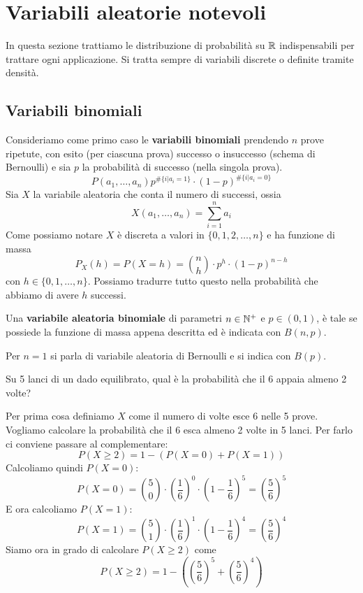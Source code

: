 \section{Variabili aleatorie notevoli}
In questa sezione trattiamo le distribuzione di probabilità su $\mathbb{R}$ indispensabili per trattare
ogni applicazione. Si tratta sempre di variabili discrete o definite tramite densità.

\subsection{Variabili binomiali}
Consideriamo come primo caso le \textbf{variabili binomiali} prendendo $n$ prove ripetute, con
esito (per ciascuna prova) successo o insuccesso (schema di Bernoulli) e sia $p$ la probabilità di
successo (nella singola prova).
\[ P(a_1, \dots, a_n) p^{\# \{i | a_i=1\}} \cdot (1-p)^{\# \{ i | a_i=0 \}} \]
Sia $X$ la variabile aleatoria che conta il numero di successi, ossia
\[ X(a_1, \dots, a_n) = \sum_{i=1}^n a_i \]
Come possiamo notare $X$ è discreta a valori in $\{0,1,2,\dots,n\}$ e ha funzione di massa
\[ P_X(h) = P(X = h) = \binom{n}{h} \cdot p^h \cdot (1-p)^{n-h} \]
con $h \in \{ 0, 1, \dots, n \}$. Possiamo tradurre tutto questo nella probabilità che abbiamo di
avere $h$ successi.

Una \textbf{variabile aleatoria binomiale} di parametri $n \in \mathbb{N}^+$ e $p \in (0,1)$, è tale se
possiede la funzione di massa appena descritta ed è indicata con $B(n, p)$.

\begin{observation}
	Per $n=1$ si parla di variabile aleatoria di Bernoulli e si indica con $B(p)$.
\end{observation}

\begin{example}
	Su 5 lanci di un dado equilibrato, qual è la probabilità che il 6 appaia almeno 2 volte?

	Per prima cosa definiamo $X$ come il numero di volte esce 6 nelle 5 prove. Vogliamo calcolare
	la probabilità che il 6 esca almeno 2 volte in 5 lanci. Per farlo ci conviene passare al
	complementare:
	\[ P(X \geq 2) = 1 - (P(X = 0) + P(X = 1)) \]
	Calcoliamo quindi $P(X=0)$:
	\[
		P(X = 0) = \binom{5}{0} \cdot \left(\frac{1}{6}\right)^0 \cdot
		\left(1 - \frac{1}{6}\right)^5 = \left(\frac{5}{6}\right)^5
	\]
	E ora calcoliamo $P(X=1)$:
	\[
		P(X = 1) = \binom{5}{1} \cdot \left(\frac{1}{6}\right)^1 \cdot
		\left(1 - \frac{1}{6}\right)^4 = \left(\frac{5}{6}\right)^4
	\]
	Siamo ora in grado di calcolare $P(X \geq 2)$ come
	\[ P(X \geq 2) = 1 - \left( \left(\frac{5}{6}\right)^5 + \left(\frac{5}{6}\right)^4 \right) \]
\end{example}

